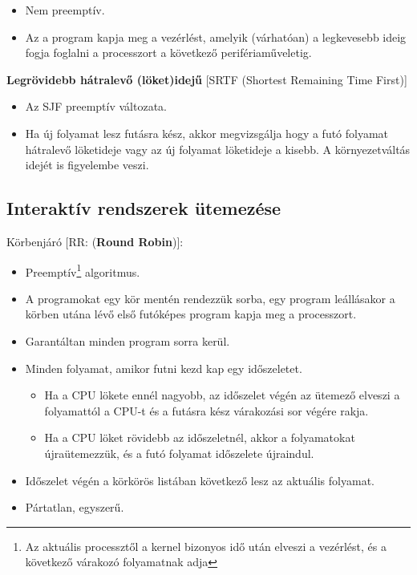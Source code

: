 \documentclass[tikz,12pt,margin=0px]{article}
\begin{document}
    \begin{itemize}[topsep=8pt,itemsep=4pt,partopsep=4pt, parsep=4pt]
        \item Nem preemptív.
        \item Az a program kapja meg a vezérlést, amelyik (várhatóan) a legkevesebb ideig fogja foglalni a processzort a következő perifériaműveletig.
    \end{itemize}

    \noindent \textbf{Legrövidebb hátralevő (löket)idejű} [SRTF (Shortest Remaining Time First)]

    \begin{itemize}[topsep=8pt,itemsep=4pt,partopsep=4pt, parsep=4pt]
        \item Az SJF preemptív változata.
        \item Ha új folyamat lesz futásra kész, akkor megvizsgálja hogy a futó folyamat hátralevő löketideje vagy az új folyamat löketideje a kisebb. A környezetváltás idejét is figyelembe veszi.
    \end{itemize}

    \subsection*{Interaktív rendszerek ütemezése\\}

    \noindent Körbenjáró [RR: (\textbf{Round Robin})]:

    \begin{itemize}[topsep=8pt,itemsep=4pt,partopsep=4pt, parsep=4pt]
        \item Preemptív\footnote{Az aktuális processztől a kernel bizonyos idő után elveszi a vezérlést, és a következő várakozó folyamatnak adja} algoritmus.
        \item A programokat egy kör mentén rendezzük sorba, egy program leállásakor a körben utána lévő első futóképes program kapja meg a processzort.
        \item Garantáltan minden program sorra kerül.
        \item Minden folyamat, amikor futni kezd kap egy időszeletet.
        \begin{itemize}
            \item Ha a CPU lökete ennél nagyobb, az időszelet végén az ütemező elveszi a folyamattól a CPU-t és a futásra kész várakozási sor végére rakja.
            \item Ha a CPU löket rövidebb az időszeletnél, akkor a folyamatokat újraütemezzük, és a futó folyamat időszelete újraindul.
        \end{itemize}
        \item Időszelet végén a körkörös listában következő lesz az aktuális folyamat.
        \item Pártatlan, egyszerű.
    \end{itemize}
\end{document}
